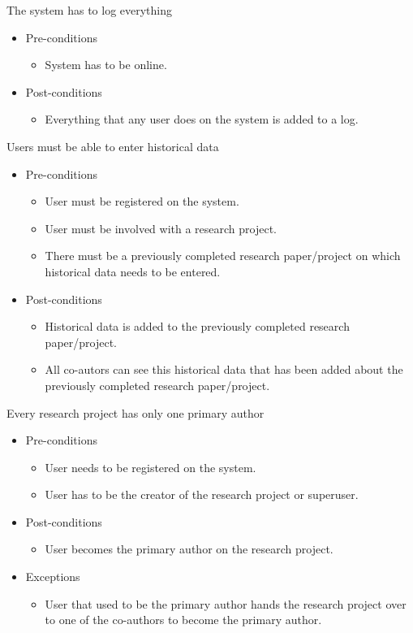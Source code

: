 \documentclass[a4paper,12pt]{report}
\begin{document}
	The system has to log everything
	\begin{itemize}
		\item Pre-conditions
			\begin{itemize}
				\item System has to be online.
			\end{itemize}
		\item Post-conditions
			\begin{itemize}
				\item Everything that any user does on the system is added to a log.
			\end{itemize}
	\end{itemize}

	Users must be able to enter historical data
	\begin{itemize}
		\item Pre-conditions
			\begin{itemize}
				\item User must be registered on the system.
				\item User must be involved with a research project.
				\item There must be a previously completed research paper/project on which historical data needs to be entered.
			\end{itemize}
		\item Post-conditions
			\begin{itemize}
				\item Historical data is added to the previously completed research paper/project.
				\item All co-autors can see this historical data that has been added about the previously completed research paper/project.
			\end{itemize}
	\end{itemize}

	Every research project has only one primary author
	\begin{itemize}
		\item Pre-conditions
			\begin{itemize}
				\item User needs to be registered on the system.
				\item User has to be the creator of the research project or superuser.
			\end{itemize}
		\item Post-conditions
			\begin{itemize}
				\item User becomes the primary author on the research project.
			\end{itemize}
		\item Exceptions
			\begin{itemize}
				\item User that used to be the primary author hands the research project over to one of the co-authors to become the primary author.
			\end{itemize}
	\end{itemize}
\end{document}
